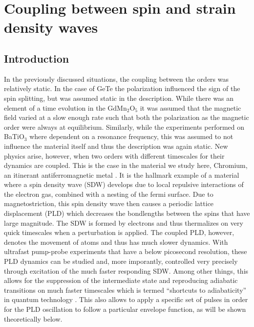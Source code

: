 \chapter{Coupling between spin and strain density waves}
\section{Introduction}
In the previously discussed situations, the coupling between the orders was relatively static.
In the case of GeTe the polarization influenced the sign of the spin splitting, but was assumed static in the description.
While there was an element of a time evolution in the GdMn$_2$O$_5$ it was assumed that the magnetic field varied at a slow enough rate such that both the polarization as the magnetic order were always at equilibrium.
Similarly, while the experiments performed on BaTiO$_3$ where dependent on a resonance frequency, this was assumed to not influence the material itself and thus the description was again static.
New physics arise, however, when two orders with different timescales for their dynamics are coupled.
This is the case in the material we study here, Chromium, an itinerant antiferromagnetic metal \cite{Kulikov1984,Fawcett1988}.
It is the hallmark example of a material where a spin density wave (SDW) develops due to local repulsive interactions of the electron gas, combined with a nesting of the fermi surface.
Due to magnetostriction, this spin density wave then causes a periodic lattice displacement (PLD) which decreases the bondlengths between the spins that have large magnitude.
The SDW is formed by electrons and thus thermalizes on very quick timescales when a perturbation is applied\cite{Nicholson2016}.
The coupled PLD, however, denotes the movement of atoms and thus has much slower dynamics.
With ultrafast pump-probe experiments that have a below picosecond resolution, these PLD dynamics can be studied and, more imporantly, controlled very precisely through excitation of the much faster responding SDW.
Among other things, this allows for the suppression of the intermediate state and reproducing adiabatic transitions on much faster timescales which is termed ``shortcuts to adiabaticity'' in quantum technology \cite{Torrontegui2013,Deffner2014,Zhou2017}.
This also allows to apply a specific set of pulses in order for the PLD oscillation to follow a particular envelope function, as will be shown theoretically below.

